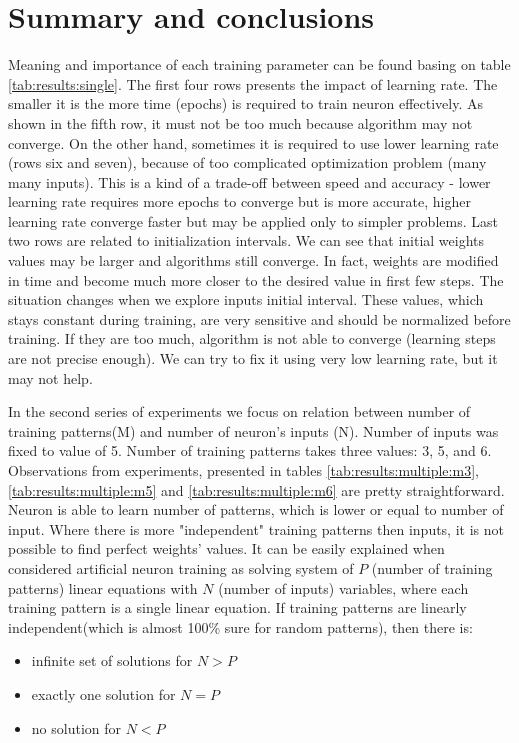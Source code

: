 \documentclass{classrep}
\begin{document}
    \section{Summary and conclusions}
    \label{summary} {
        Meaning and importance of each training parameter can be found basing on table
        \ref{tab:results:single}. The first four rows presents the impact of learning
        rate. The smaller it is the more time (epochs) is required to train neuron
        effectively. As shown in the fifth row, it must not be too much because
        algorithm may not converge. On the other hand, sometimes it is required to use
        lower learning rate (rows six and seven), because of too complicated
        optimization problem (many many inputs). This is a kind of a trade-off between
        speed and accuracy - lower learning rate requires more epochs to converge but is
        more accurate, higher learning rate converge faster but may be applied only to
        simpler problems. Last two rows are related to initialization intervals. We can
        see that initial weights values may be larger and algorithms still converge. In
        fact, weights are modified in time and become much more closer to the desired
        value in first few steps. The situation changes when we explore inputs initial
        interval. These values, which stays constant during training, are very
        sensitive and should be normalized before training. If they are too much,
        algorithm is not able to converge (learning steps are not precise enough). We
        can try to fix it using very low learning rate, but it may not help.

        In the second series of experiments we focus on relation between number of
        training patterns(M) and number of neuron's inputs (N). Number of inputs was
        fixed to value of 5. Number of training patterns takes three values: 3, 5, and
        6. Observations from experiments, presented in tables
        \ref{tab:results:multiple:m3}, \ref{tab:results:multiple:m5} and
        \ref{tab:results:multiple:m6} are pretty straightforward. Neuron is able to
        learn number of patterns, which is lower or equal to number of input. Where
        there is more "independent" training patterns then inputs, it is not possible
        to find perfect weights' values. It can be easily explained when considered
        artificial neuron training as solving system of $P$ (number of training
        patterns) linear equations with $N$ (number of inputs) variables, where each
        training pattern is a single linear equation. If training patterns are linearly
        independent(which is almost 100\% sure for random patterns), then there is:

        \begin{itemize}
            \item infinite set of solutions for $N > P$
            \item exactly one solution for $N = P$
            \item no solution for $N < P$
        \end{itemize}
    }


    \begin{thebibliography}{0}
    \end{thebibliography}
\end{document}
